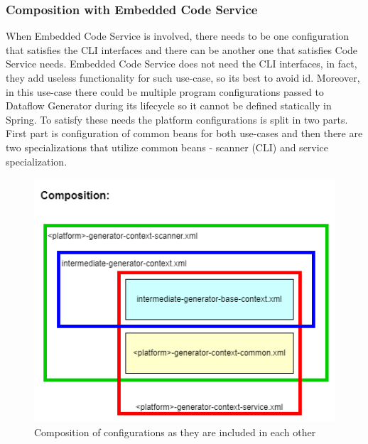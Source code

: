 \subsubsection{Composition with Embedded Code Service}
When Embedded Code Service is involved, there needs to be one configuration that satisfies the CLI interfaces and there can be another one that satisfies Code Service needs. Embedded Code Service does not need the CLI interfaces, in fact, they add useless functionality for such use-case, so its best to avoid id. Moreover, in this use-case there could be multiple program configurations passed to Dataflow Generator during its lifecycle so it cannot be defined statically in Spring. To satisfy these needs the platform configurations is split in two parts. First part is configuration of common beans for both use-cases and then there are two specializations that utilize common beans - scanner (CLI) and service specialization.
\begin{figure}[ht]\centering
\includegraphics[width=1.0\textwidth]{img/Intermediate Dataflow Generator Configuration-code service-aware composition.png}
\caption{Composition of configurations as they are included in each other}
\label{fig01:ECSbasedesign02}
\end{figure}  

